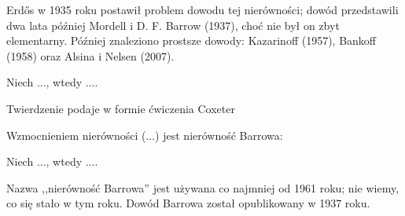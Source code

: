 %

\label{subsection_erdos_mordell}
Erdős w 1935 roku postawił problem dowodu tej nierówności; dowód przedstawili dwa lata później Mordell i D. F. Barrow (1937), choć nie był on zbyt elementarny. Później znaleziono prostsze dowody: Kazarinoff (1957), Bankoff (1958) oraz Alsina i Nelsen (2007).

\begin{theorem}
    Niech ..., wtedy ....
\end{theorem}

Twierdzenie podaje w formie ćwiczenia Coxeter \cite[s. 9]{coxeter_1991}

Wzmocnieniem nierówności (...) jest nierówność Barrowa:


\begin{theorem}
    Niech ..., wtedy ....
\end{theorem}

Nazwa ,,nierówność Barrowa'' jest używana co najmniej od 1961 roku; nie wiemy, co się stało w tym roku.
Dowód Barrowa został opublikowany w 1937 roku.

%